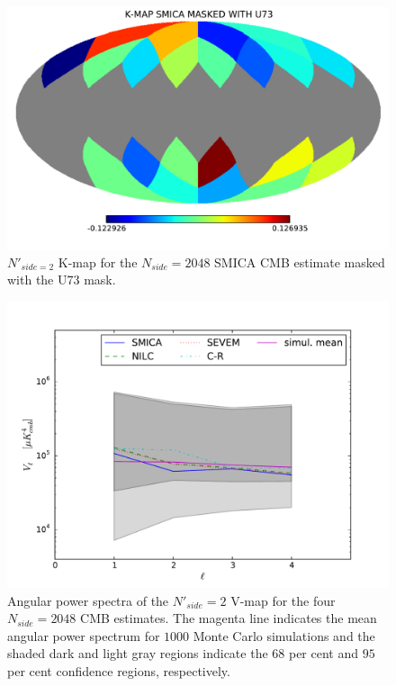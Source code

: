 \begin{figure}
\centering
\includegraphics[width=\textwidth]{figures/chapter-vsk/kmap-u73-smica.pdf}
\caption{$N'_{side = 2}$  K-map for the $N_{side} = 2048$ SMICA CMB estimate masked with the U73 mask.}
\label{Fig:3b}
\end{figure}

\begin{figure}
\centering
\includegraphics[width=\textwidth]{figures/chapter-vsk/Vl_u73.pdf}
\caption{Angular power spectra of the $N'_{side} = 2$ V-map for the four $N_{side} = 2048$ CMB estimates. The magenta line indicates the mean angular power spectrum for $1000$ Monte Carlo simulations and the shaded dark and light gray regions indicate the $68$ per cent and $95$ per cent confidence regions, respectively.}
\label{Fig:4}
\end{figure}

